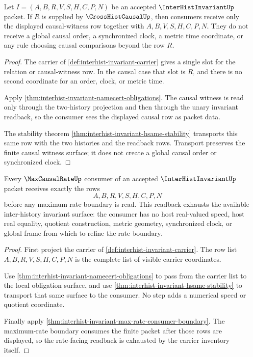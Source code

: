 \begin{theorem}
\label{thm:interhist-invariant-causal-row-choice-boundary}
Let $I=(A,B,R,V,S,H,C,P,N)$ be an accepted $\InterHistInvariantUp$ packet. If $R$ is supplied by $\CrossHistCausalUp$, then consumers receive only the displayed causal-witness row together with $A,B,V,S,H,C,P,N$. They do not receive a global causal order, a synchronized clock, a metric time coordinate, or any rule choosing causal comparisons beyond the row $R$.
\end{theorem}
\begin{proof}
The carrier of \autoref{def:interhist-invariant-carrier} gives a single slot for the relation or causal-witness row. In the causal case that slot is $R$, and there is no second coordinate for an order, clock, or metric time.

Apply \autoref{thm:interhist-invariant-namecert-obligations}. The causal witness is read only through the two-history projection and then through the unary invariant readback, so the consumer sees the displayed causal row as packet data.

The stability theorem \autoref{thm:interhist-invariant-hsame-stability} transports this same row with the two histories and the readback rows. Transport preserves the finite causal witness surface; it does not create a global causal order or synchronized clock.
\end{proof}

\begin{theorem}
\label{thm:interhist-invariant-rate-consumer-readback-exhaustion}
Every $\MaxCausalRateUp$ consumer of an accepted $\InterHistInvariantUp$ packet receives exactly the rows
$$
A,B,R,V,S,H,C,P,N
$$
before any maximum-rate boundary is read. This readback exhausts the available inter-history invariant surface: the consumer has no host real-valued speed, host real equality, quotient construction, metric geometry, synchronized clock, or global frame from which to refine the rate boundary.
\end{theorem}
\begin{proof}
First project the carrier of \autoref{def:interhist-invariant-carrier}. The row list $A,B,R,V,S,H,C,P,N$ is the complete list of visible carrier coordinates.

Use \autoref{thm:interhist-invariant-namecert-obligations} to pass from the carrier list to the local obligation surface, and use \autoref{thm:interhist-invariant-hsame-stability} to transport that same surface to the consumer. No step adds a numerical speed or quotient coordinate.

Finally apply \autoref{thm:interhist-invariant-max-rate-consumer-boundary}. The maximum-rate boundary consumes the finite packet after those rows are displayed, so the rate-facing readback is exhausted by the carrier inventory itself.
\end{proof}

